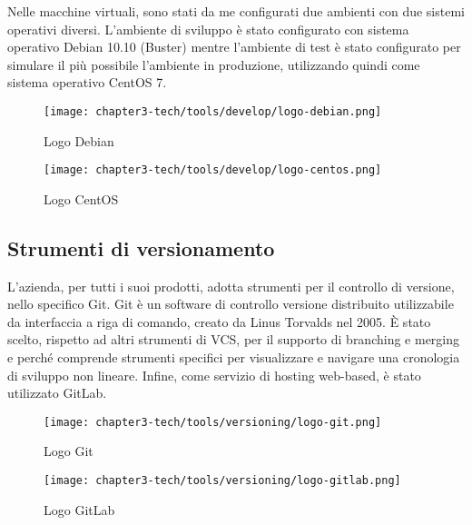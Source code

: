 \noindent
Nelle macchine virtuali, sono stati da me configurati due ambienti con due sistemi operativi diversi. L'ambiente di sviluppo è stato configurato con sistema operativo Debian 10.10 (Buster) mentre l'ambiente di test è stato configurato per simulare il più possibile l'ambiente in produzione, utilizzando quindi come sistema operativo CentOS 7.
\begin{figure}[!h]
    \begin{minipage}{.5\textwidth} 
        \centering 
        \texttt{[image: chapter3-tech/tools/develop/logo-debian.png]} 
        \caption{Logo Debian} 
        \label{fig:virtualbox} 
    \end{minipage}%
    \begin{minipage}{.5\textwidth} 
        \centering 
        \texttt{[image: chapter3-tech/tools/develop/logo-centos.png]} 
        \caption{Logo CentOS} 
        \label{fig:pycharm} 
    \end{minipage}  
\end{figure}
\subsection{Strumenti di versionamento}

L’azienda, per tutti i suoi prodotti, adotta strumenti per il controllo di versione, nello specifico Git. Git è un software di controllo versione distribuito utilizzabile da interfaccia a riga di comando, creato da Linus Torvalds nel 2005. È stato scelto, rispetto ad altri strumenti di \gls{VCS}, per il supporto di branching e merging e perché comprende strumenti specifici per visualizzare e navigare una cronologia di sviluppo non lineare. Infine, come servizio di hosting web-based, è stato utilizzato GitLab.

\begin{figure}[!h]
    \begin{minipage}{.5\textwidth} 
        \centering 
        \texttt{[image: chapter3-tech/tools/versioning/logo-git.png]} 
        \caption{Logo Git} 
        \label{fig:git} 
    \end{minipage}%
    \begin{minipage}{.5\textwidth} 
        \centering 
        \texttt{[image: chapter3-tech/tools/versioning/logo-gitlab.png]} 
        \caption{Logo GitLab} 
        \label{fig:gitlab} 
    \end{minipage}  
\end{figure}

